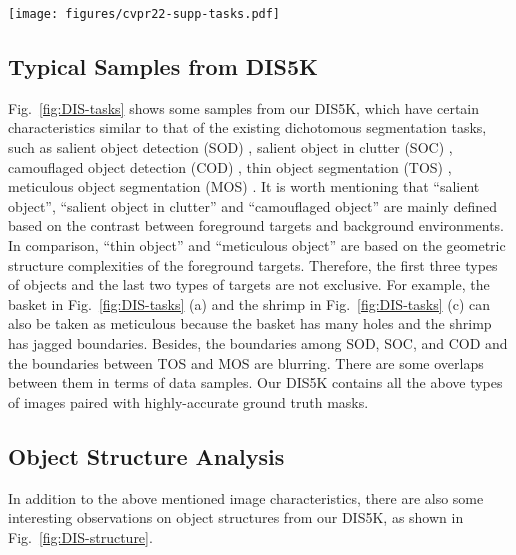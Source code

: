 \documentclass[10pt,twocolumn,letterpaper]{article}
\begin{document}
\begin{figure*}[thbp]
    \centering
    \texttt{[image: figures/cvpr22-supp-tasks.pdf]}
\caption{\small Sample images and ground truth masks with objects of certain characteristics.}
    \label{fig:DIS-tasks}
\end{figure*}

\subsection{Typical Samples from DIS5K} 
Fig.~\ref{fig:DIS-tasks} shows some samples from our DIS5K, which have certain characteristics similar to that of the existing dichotomous segmentation tasks, such as salient object detection (SOD) \cite{wang2017learning}, salient object in clutter (SOC) \cite{fan2018SOC}, camouflaged object detection (COD) \cite{fan2020camouflaged}, thin object segmentation (TOS) \cite{liew2021deep}, meticulous object segmentation (MOS) \cite{yang2020meticulous}. It is worth mentioning that ``salient object'', ``salient object in clutter'' and ``camouflaged object'' are mainly defined based on the contrast between foreground targets and background environments. In comparison, ``thin object'' and ``meticulous object'' are based on the geometric structure complexities of the foreground targets. Therefore, the first three types of objects and the last two types of targets are not exclusive. For example,  the basket in Fig.~\ref{fig:DIS-tasks} (a) and the shrimp in Fig.~\ref{fig:DIS-tasks} (c) can also be taken as meticulous because the basket has many holes and the shrimp has jagged boundaries. Besides, the boundaries among SOD, SOC, and COD and the boundaries between TOS and MOS are blurring. There are some overlaps between them in terms of data samples. Our DIS5K contains all the above types of images paired with highly-accurate ground truth masks. 

\subsection{Object Structure Analysis} 
In addition to the above mentioned image characteristics, there are also some interesting observations on object structures from our DIS5K, as shown in Fig.~\ref{fig:DIS-structure}. 
\end{document}

